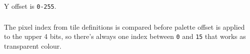 \begin{NextPort}
\end{NextPort}

Y offset is {\tt 0-255}.


\subsubsection{}
\vspace*{-2ex}
\subsubsection{}
\vspace*{-2ex}
\subsubsection{}
\vspace*{-2ex}
\subsubsection{}


\subsubsection{}

\begin{NextPort}
\end{NextPort}

The pixel index from tile definitions is compared before palette offset is applied to the upper 4 bits, so there's always one index between {\tt 0} and {\tt 15} that works as transparent colour.


\subsubsection{}

